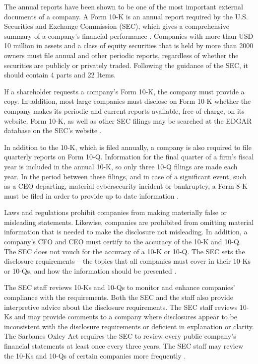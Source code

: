 The annual reports have been shown to be one of the most important external documents of a company. A Form 10-K is an annual report required by the U.S. Securities and Exchange Commission (SEC), which gives a comprehensive summary of a company's financial performance \cite{USSEC.2024}. Companies with more than USD 10 million in assets and a class of equity securities that is held by more than 2000 owners must file annual and other periodic reports, regardless of whether the securities are publicly or privately traded. Following the guidance of the SEC, it should contain 4 parts and 22 Items. 

If a shareholder requests a company's Form 10-K, the company must provide a copy. In addition, most large companies must disclose on Form 10-K whether the company makes its periodic and current reports available, free of charge, on its website. Form 10-K, as well as other SEC filings may be searched at the EDGAR database on the SEC's website \cite{SECOfficeofInvestorEducationandAdvocacy.2021}.

In addition to the 10-K, which is filed annually, a company is also required to file quarterly reports on Form 10-Q. Information for the final quarter of a firm's fiscal year is included in the annual 10-K, so only three 10-Q filings are made each year. In the period between these filings, and in case of a significant event, such as a CEO departing, material cybersecurity incident or bankruptcy, a Form 8-K must be filed in order to provide up to date information \cite{SECOfficeofInvestorEducationandAdvocacy.2021}.

Laws and regulations prohibit companies from making materially false or misleading statements. Likewise, companies are prohibited from omitting material information that is needed to make the disclosure not misleading. In addition, a company’s CFO and CEO must certify to the accuracy of the 10-K and 10-Q.
The SEC does not vouch for the accuracy of a 10-K or 10-Q. The SEC sets the disclosure requirements – the topics that all companies must cover in their 10-Ks or 10-Qs, and how the information should be presented \cite{SECOfficeofInvestorEducationandAdvocacy.2021}.

The SEC staff reviews 10-Ks and 10-Qs to monitor and enhance companies’ compliance with the requirements. Both the SEC and the staff also provide interpretive advice about the disclosure requirements. The SEC staff reviews 10-Ks and may provide comments to a company where disclosures appear to be inconsistent with the disclosure requirements or deficient in explanation or clarity. The Sarbanes Oxley Act requires the SEC to review every public company’s financial statements at least once every three years. The SEC staff may review the 10-Ks and 10-Qs of certain companies more frequently \cite{SECOfficeofInvestorEducationandAdvocacy.2021}.


